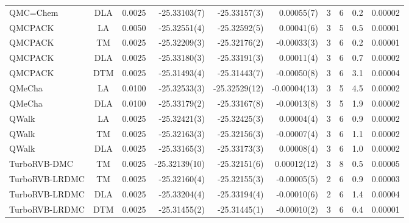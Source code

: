 \begin{tabular}{|lc|lr|r|r|cccc|}
QMC=Chem         &  DLA  & 0.0025 & -25.33103(7) & -25.33157(3) & 0.00055(7) & 3 & 6 & 0.2 & 0.00002 \\
QMCPACK          &  LA   & 0.0050 & -25.32551(4) & -25.32592(5) & 0.00041(6) & 3 & 5 & 0.5 & 0.00001 \\
QMCPACK          &  TM   & 0.0025 & -25.32209(3) & -25.32176(2) & -0.00033(3) & 3 & 6 & 0.2 & 0.00001 \\
QMCPACK          &  DLA  & 0.0025 & -25.33180(3) & -25.33191(3) & 0.00011(4) & 3 & 6 & 0.7 & 0.00002 \\
QMCPACK          &  DTM  & 0.0025 & -25.31493(4) & -25.31443(7) & -0.00050(8) & 3 & 6 & 3.1 & 0.00004 \\
QMeCha           &  LA   & 0.0100 & -25.32533(3) & -25.32529(12) & -0.00004(13) & 3 & 5 & 4.5 & 0.00002 \\
QMeCha           &  DLA  & 0.0100 & -25.33179(2) & -25.33167(8) & -0.00013(8) & 3 & 5 & 1.9 & 0.00002 \\
QWalk            &  LA   & 0.0025 & -25.32421(3) & -25.32425(3) & 0.00004(4) & 3 & 6 & 0.9 & 0.00002 \\
QWalk            &  TM   & 0.0025 & -25.32163(3) & -25.32156(3) & -0.00007(4) & 3 & 6 & 1.1 & 0.00002 \\
QWalk            &  DLA  & 0.0025 & -25.33165(3) & -25.33173(3) & 0.00008(4) & 3 & 6 & 1.0 & 0.00002 \\
TurboRVB-DMC     &  TM   & 0.0025 & -25.32139(10) & -25.32151(6) & 0.00012(12) & 3 & 8 & 0.5 & 0.00005 \\
TurboRVB-LRDMC   &  TM   & 0.0025 & -25.32160(4) & -25.32155(3) & -0.00005(5) & 2 & 6 & 0.9 & 0.00003 \\
TurboRVB-LRDMC   &  DLA  & 0.0025 & -25.33204(4) & -25.33194(4) & -0.00010(6) & 2 & 6 & 1.4 & 0.00004 \\
TurboRVB-LRDMC   &  DTM  & 0.0025 & -25.31455(2) & -25.31445(1) & -0.00010(2) & 3 & 6 & 0.4 & 0.00001 \\
\bottomrule
\end{tabular}

